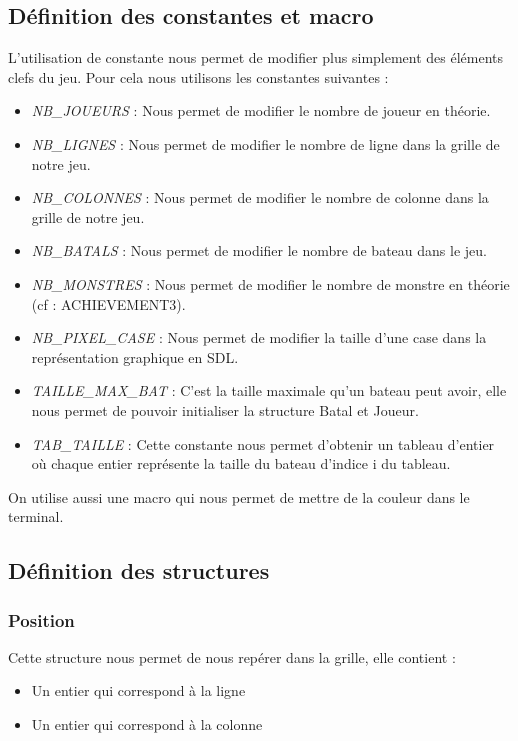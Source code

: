 \subsection{Définition des constantes et macro}

L'utilisation de constante nous permet de modifier plus simplement des
éléments clefs du jeu. Pour cela nous utilisons les constantes suivantes
:  
\begin{itemize}
\item {\textit{NB\_JOUEURS}} : Nous permet de modifier le nombre de
  joueur en théorie.
\item {\textit{NB\_LIGNES}} : Nous permet de modifier le nombre de
  ligne dans la grille de notre jeu.
\item {\textit{NB\_COLONNES}} : Nous permet de modifier le nombre de
  colonne dans la grille de notre jeu.
\item {\textit{NB\_BATALS}} : Nous permet de modifier le nombre de
  bateau dans le jeu.
\item {\textit{NB\_MONSTRES}} : Nous permet de modifier le nombre de
  monstre en théorie (cf : ACHIEVEMENT3).
\item {\textit{NB\_PIXEL\_CASE}} : Nous permet de modifier la taille
  d'une case dans la représentation graphique en SDL.
\item {\textit{TAILLE\_MAX\_BAT}} : C'est la taille maximale qu'un
  bateau peut avoir, elle nous permet de pouvoir initialiser la
  structure Batal et Joueur.
\item {\textit{TAB\_TAILLE}} : Cette constante nous permet d'obtenir un tableau d'entier où chaque entier représente la taille du bateau d'indice i du tableau.
\end{itemize}
On utilise aussi une macro qui nous permet de mettre de la couleur
dans le terminal.

\subsection{Définition des structures}

\subsubsection{Position}
Cette structure nous permet de nous repérer dans la grille, elle contient : 
\begin{itemize}
\item Un entier qui correspond à la ligne
\item Un entier qui correspond à la colonne
\end{itemize}

